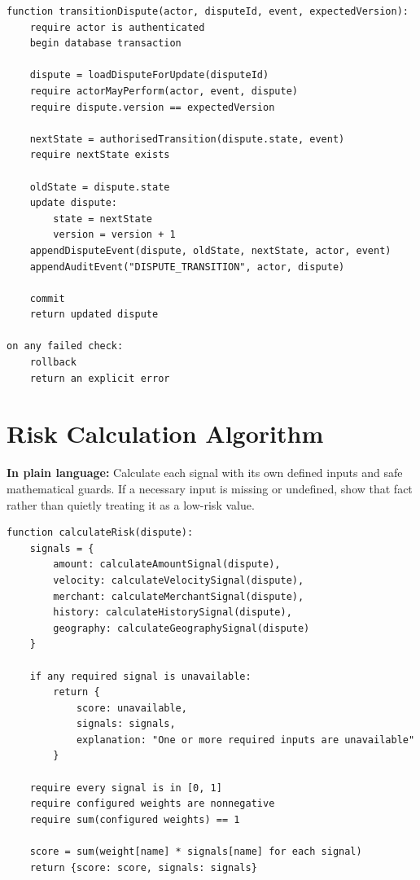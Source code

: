 \documentclass[11pt,a4paper]{article}
\begin{document}
\begin{lstlisting}[style=pseudocode,caption={Changing a dispute state}]
function transitionDispute(actor, disputeId, event, expectedVersion):
    require actor is authenticated
    begin database transaction

    dispute = loadDisputeForUpdate(disputeId)
    require actorMayPerform(actor, event, dispute)
    require dispute.version == expectedVersion

    nextState = authorisedTransition(dispute.state, event)
    require nextState exists

    oldState = dispute.state
    update dispute:
        state = nextState
        version = version + 1
    appendDisputeEvent(dispute, oldState, nextState, actor, event)
    appendAuditEvent("DISPUTE_TRANSITION", actor, dispute)

    commit
    return updated dispute

on any failed check:
    rollback
    return an explicit error
\end{lstlisting}

\section{Risk Calculation Algorithm}

\textbf{In plain language:} Calculate each signal with its own defined
inputs and safe mathematical guards. If a necessary input is missing or
undefined, show that fact rather than quietly treating it as a
low-risk value.

\begin{lstlisting}[style=pseudocode,caption={Calculating an explainable risk indicator}]
function calculateRisk(dispute):
    signals = {
        amount: calculateAmountSignal(dispute),
        velocity: calculateVelocitySignal(dispute),
        merchant: calculateMerchantSignal(dispute),
        history: calculateHistorySignal(dispute),
        geography: calculateGeographySignal(dispute)
    }

    if any required signal is unavailable:
        return {
            score: unavailable,
            signals: signals,
            explanation: "One or more required inputs are unavailable"
        }

    require every signal is in [0, 1]
    require configured weights are nonnegative
    require sum(configured weights) == 1

    score = sum(weight[name] * signals[name] for each signal)
    return {score: score, signals: signals}
\end{lstlisting}
\end{document}
